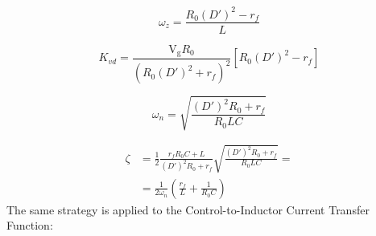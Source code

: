 \documentclass[DIV=calc, paper=a4, fontsize=11pt, twocolumn]{scrartcl}	 %
\begin{document}
\begin{equation}
\omega_z = \frac{R_0 (D')^2 - r_f}{L}
\end{equation}

\begin{equation}
K_{vd} = \frac{\mathrm{V_g} R_0}{(R_0 (D')^2 + r_f)^2} \left[ R_0 (D')^2 - r_f \right]
\end{equation}

\begin{equation}
\omega_n = \sqrt{\frac{(D')^2 R_0 + r_f}{R_0 L C}}
\end{equation}

{\small
\begin{equation}
\begin{split}
\zeta &= \frac{1}{2} \frac{r_f R_0 C + L}{(D')^2 R_0 + r_f} \sqrt{\frac{(D')^2 R_0 + r_f}{R_0 L C}} = \\
      &= \frac{1}{2\omega_n} \left( \frac{r_f}{L} + \frac{1}{R_0 C} \right)
\end{split}
\end{equation}
}
The same strategy is applied to the Control-to-Inductor Current Transfer Function:
\end{document}
